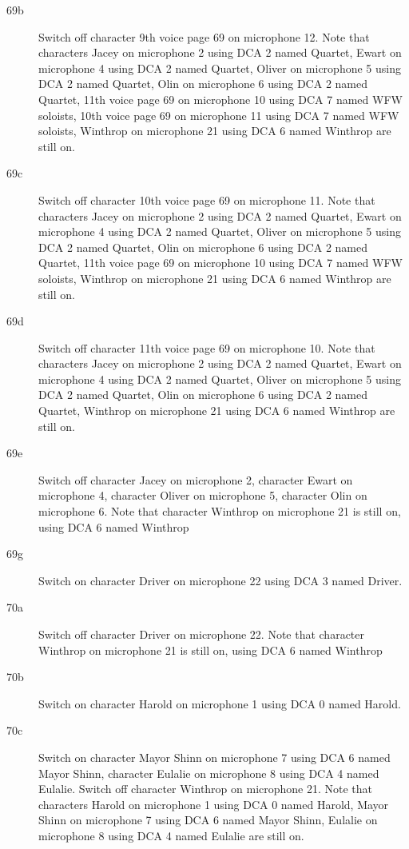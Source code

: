 \begin{description}
\item[69b]
Switch off character 9th voice page 69 on microphone 12. Note that characters Jacey on microphone 2 using DCA 2 named Quartet, Ewart on microphone 4 using DCA 2 named Quartet, Oliver on microphone 5 using DCA 2 named Quartet, Olin on microphone 6 using DCA 2 named Quartet, 11th voice page 69 on microphone 10 using DCA 7 named WFW soloists, 10th voice page 69 on microphone 11 using DCA 7 named WFW soloists, Winthrop on microphone 21 using DCA 6 named Winthrop are still on.  

\item[69c]
Switch off character 10th voice page 69 on microphone 11. Note that characters Jacey on microphone 2 using DCA 2 named Quartet, Ewart on microphone 4 using DCA 2 named Quartet, Oliver on microphone 5 using DCA 2 named Quartet, Olin on microphone 6 using DCA 2 named Quartet, 11th voice page 69 on microphone 10 using DCA 7 named WFW soloists, Winthrop on microphone 21 using DCA 6 named Winthrop are still on.  

\item[69d]
Switch off character 11th voice page 69 on microphone 10. Note that characters Jacey on microphone 2 using DCA 2 named Quartet, Ewart on microphone 4 using DCA 2 named Quartet, Oliver on microphone 5 using DCA 2 named Quartet, Olin on microphone 6 using DCA 2 named Quartet, Winthrop on microphone 21 using DCA 6 named Winthrop are still on.  

\item[69e]
Switch off character Jacey on microphone 2, character Ewart on microphone 4, character Oliver on microphone 5, character Olin on microphone 6. Note that character Winthrop on microphone 21 is still on, using DCA 6 named Winthrop

\item[69g]
Switch on character Driver on microphone 22 using DCA 3 named Driver. 

\item[70a]
Switch off character Driver on microphone 22. Note that character Winthrop on microphone 21 is still on, using DCA 6 named Winthrop

\item[70b]
Switch on character Harold on microphone 1 using DCA 0 named Harold. 

\item[70c]
Switch on character Mayor Shinn on microphone 7 using DCA 6 named Mayor Shinn, character Eulalie on microphone 8 using DCA 4 named Eulalie. Switch off character Winthrop on microphone 21. Note that characters Harold on microphone 1 using DCA 0 named Harold, Mayor Shinn on microphone 7 using DCA 6 named Mayor Shinn, Eulalie on microphone 8 using DCA 4 named Eulalie are still on.  


\end{description}
